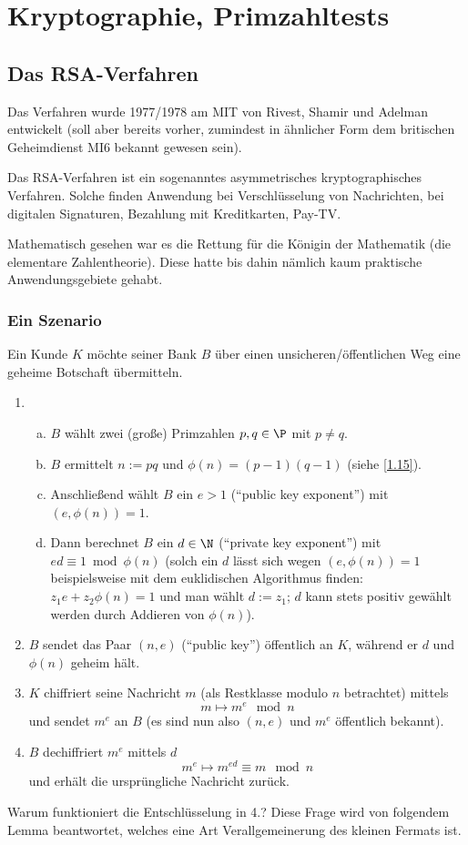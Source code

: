 \chapter{Kryptographie, Primzahltests}



\section{Das RSA-Verfahren}

Das Verfahren wurde 1977/1978 am MIT von Rivest, Shamir und Adelman entwickelt (soll aber bereits vorher, zumindest in ähnlicher Form dem britischen Geheimdienst MI6 bekannt gewesen sein).

Das RSA-Verfahren ist ein sogenanntes asymmetrisches kryptographisches Verfahren.
Solche finden Anwendung bei Verschlüsselung von Nachrichten, bei digitalen Signaturen, Bezahlung mit Kreditkarten, Pay-TV.

Mathematisch gesehen war es die Rettung für die Königin der Mathematik (die elementare Zahlentheorie).
Diese hatte bis dahin nämlich kaum praktische Anwendungsgebiete gehabt.


\subsection*{Ein Szenario}

Ein Kunde $K$ möchte seiner Bank $B$ über einen unsicheren/öffentlichen Weg eine geheime Botschaft übermitteln.
\begin{enumerate}[1.]
	\item
		\begin{enumerate}[a)]
			\item
				$B$ wählt zwei (große) Primzahlen $p, q \in \P$ mit $p \neq q$.
			\item
				$B$ ermittelt $n := pq$ und $\phi(n) = (p-1)(q-1)$ (siehe \ref{1.15}).
			\item
				Anschließend wählt $B$ ein $e > 1$ (“public key exponent”) mit $(e, \phi(n)) = 1$.
			\item
				Dann berechnet $B$ ein $d \in \N$ (“private key exponent”) mit $ed \equiv 1 \bmod \phi(n)$ (solch ein $d$ lässt sich wegen $(e, \phi(n)) = 1$ beispielsweise mit dem euklidischen Algorithmus finden: $z_1 e + z_2 \phi(n) = 1$ und man wählt $d := z_1$; $d$ kann stets positiv gewählt werden durch Addieren von $\phi(n)$).
		\end{enumerate}
	\item
		$B$ sendet das Paar $(n, e)$ (“public key”) öffentlich an $K$, während er $d$ und $\phi(n)$ geheim hält.
	\item
		$K$ chiffriert seine Nachricht $m$ (als Restklasse modulo $n$ betrachtet) mittels
		\[
			m \mapsto m^e \mod n
		\]
		und sendet $m^e$ an $B$ (es sind nun also $(n, e)$ und $m^e$ öffentlich bekannt).
	\item
		$B$ dechiffriert $m^e$ mittels $d$
		\[
			m^e \mapsto m^{ed} \equiv m \mod n
		\]
		und erhält die ursprüngliche Nachricht zurück.
\end{enumerate}
Warum funktioniert die Entschlüsselung in 4.?
Diese Frage wird von folgendem Lemma beantwortet, welches eine Art Verallgemeinerung des kleinen Fermats ist.

